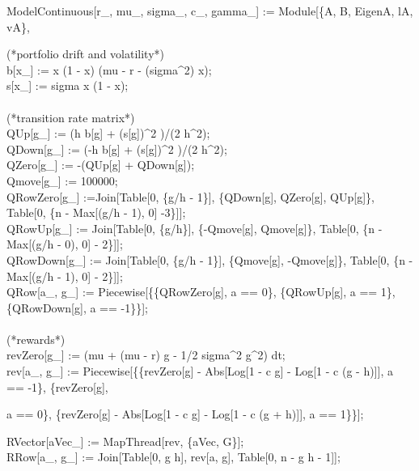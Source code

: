 \begin{scriptsize} 

ModelContinuous[r\_, mu\_, sigma\_, c\_, gamma\_] := Module[\{A, B, EigenA, lA, vA\},\\

  \begin{addmargin}[1em]{0em}
  (*portfolio drift and volatility*)\\
  b[x\_] := x (1 - x) (mu - r - (sigma\textasciicircum 2) x);\\
  s[x\_] := sigma x (1 - x);\\
  \\
  (*transition rate matrix*)\\
  QUp[g\_] := (h b[g]  + (s[g])\textasciicircum 2  )/(2 h\textasciicircum 2);\\
  QDown[g\_] := (-h b[g]  + (s[g])\textasciicircum 2  )/(2 h\textasciicircum 2);\\
  QZero[g\_] := -(QUp[g] + QDown[g]);\\
  Qmove[g\_] := 100000;\\
  QRowZero[g\_] :=Join[Table[0, \{g/h - 1\}], \{QDown[g], QZero[g], QUp[g]\}, Table[0, \{n - Max[(g/h - 1), 0] -3\}]];\\
  QRowUp[g\_] := Join[Table[0, \{g/h\}], \{-Qmove[g], Qmove[g]\}, Table[0, \{n - Max[(g/h - 0), 0] - 2\}]];\\
  QRowDown[g\_] := Join[Table[0, \{g/h - 1\}], \{Qmove[g], -Qmove[g]\}, Table[0, \{n - Max[(g/h - 1), 0] - 2\}]];\\
  QRow[a\_, g\_] := Piecewise[\{\{QRowZero[g], a == 0\}, \{QRowUp[g], a == 1\}, \{QRowDown[g], a == -1\}\}];\\
  \\
  (*rewards*)\\
  revZero[g\_] := (mu + (mu - r) g - 1/2 sigma\textasciicircum 2 g\textasciicircum 2) dt;\\
  rev[a\_, g\_] := Piecewise[\{\{revZero[g] - Abs[Log[1 - c g] - Log[1 - c (g - h)]], a == -1\}, \{revZero[g],
    \begin{addmargin}[1em]{0em}
    a == 0\}, \{revZero[g] - Abs[Log[1 - c g] - Log[1 - c (g + h)]], a == 1\}\}];
    \end{addmargin}
  RVector[aVec\_] := MapThread[rev, \{aVec, G\}];\\
  RRow[a\_, g\_] :=  Join[Table[0, g h], rev[a, g], Table[0, n - g h - 1]];\\
  \\

\end{addmargin}
\end{scriptsize}
